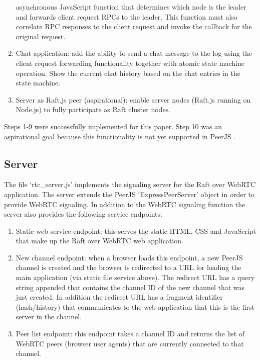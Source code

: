 \documentclass[conference,compsoc]{./IEEEtran/IEEEtran}
\begin{document}
\begin{enumerate}
    asynchronous JavaScript function that determines which node is the
    leader and forwards client request RPCs to the leader. This
    function must also correlate RPC responses to the client request
    and invoke the callback for the original request.
\item Chat application: add the ability to send a chat message to the
    log using the client request forwarding functionality together
    with atomic state machine operation. Show the current chat history
    based on the chat entries in the state machine.
\item Server as Raft.js peer (aspirational): enable server nodes
    (Raft.js running on Node.js) to fully participate as Raft cluster
    nodes.
\end{enumerate}

Steps 1-9 were successfully implemented for this paper. Step 10 was an
aspirational goal because this functionality is not yet supported in
PeerJS \cite{peerjs:103}.

\fi  %

\subsection{Server}

The file `rtc\_server.js' implements the signaling server for the Raft
over WebRTC application. The server extends the PeerJS
`ExpressPeerServer' object in order to provide WebRTC signaling. In
addition to the WebRTC signaling function the server also provides the
following service endpoints:

\begin{enumerate}
\item Static web service endpoint: this serves the static HTML, CSS
    and JavaScript that make up the Raft over WebRTC web application.
\item New channel endpoint: when a browser loads this endpoint, a new
    PeerJS channel is created and the browser is redirected to a URL
    for loading the main application (via static file service above).
    The redirect URL has a query string appended that contains the
    channel ID of the new channel that was just created. In addition
    the redirect URL has a fragment identifier (hash/history) that
    communicates to the web application that this is the first server
    in the channel.
\item Peer list endpoint: this endpoint takes a channel ID and returns
    the list of WebRTC peers (browser user agents) that are currently
    connected to that channel.

\end{enumerate}
\end{document}
